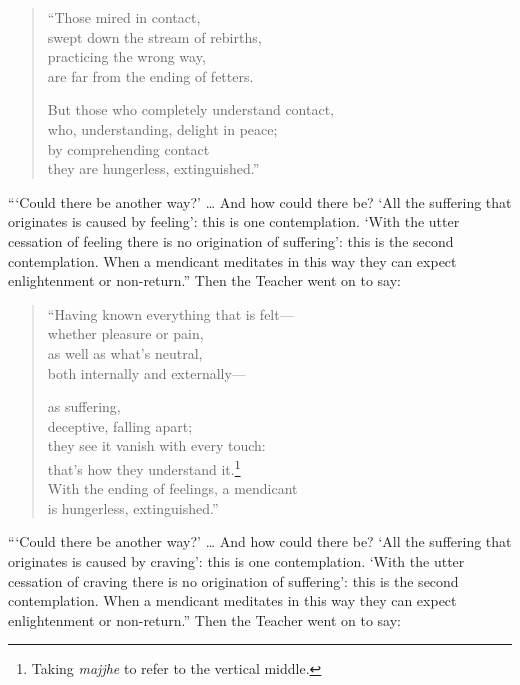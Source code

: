 \documentclass[12pt,openany]{book}%
\begin{document}
\begin{verse}%
“Those mired in contact, \\
swept down the stream of rebirths, \\
practicing the wrong way, \\
are far from the ending of fetters. 

But those who completely understand contact, \\
who, understanding, delight in peace; \\
by comprehending contact \\
they are hungerless, extinguished.” 

%
\end{verse}

“‘Could there be another way?’ … And how could there be? ‘All the suffering that originates is caused by feeling’: this is one contemplation. ‘With the utter cessation of feeling there is no origination of suffering’: this is the second contemplation. When a mendicant meditates in this way they can expect enlightenment or non-return.” Then the Teacher went on to say: 

\begin{verse}%
“Having known everything that is felt—\\
whether pleasure or pain, \\
as well as what’s neutral, \\
both internally and externally—

as suffering, \\
deceptive, falling apart; \\
they see it vanish with every touch: \\
that’s how they understand it.\footnote{Taking \textit{majjhe} to refer to the vertical middle. } \\
With the ending of feelings, a mendicant \\
is hungerless, extinguished.” 

%
\end{verse}

“‘Could there be another way?’ … And how could there be? ‘All the suffering that originates is caused by craving’: this is one contemplation. ‘With the utter cessation of craving there is no origination of suffering’: this is the second contemplation. When a mendicant meditates in this way they can expect enlightenment or non-return.” Then the Teacher went on to say: 
\end{document}

